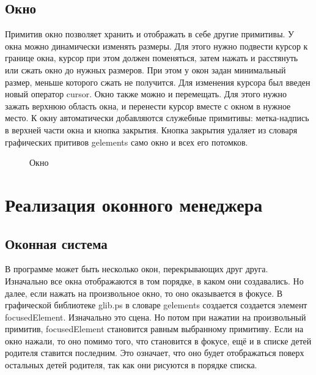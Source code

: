 \documentclass[14pt]{extarticle}
\begin{document}
	\subsection*{Окно}
	Примитив окно позволяет хранить и отображать в себе другие примитивы. У окна можно динамически изменять размеры. Для этого нужно подвести курсор к границе окна, курсор при этом должен поменяться, затем нажать и расстянуть или сжать окно до нужных размеров. При этом у окон задан минимальный размер, меньше которого сжать не получится. Для изменения курсора был введен новый оператор cursor. Окно также можно и перемещать. Для этого нужно зажать верхнюю область окна, и перенести курсор вместе с окном в нужное место. К окну автоматически добавляются служебные примитивы: метка-надпись в верхней части окна и кнопка закрытия. Кнопка закрытия удаляет из словаря графических притивов gelements само окно и всех его потомков.
		\begin{figure}[h]
		\caption{ Окно }
		\label{ris:image}
		\end{figure}	
	\pagebreak
	
	\section{Реализация оконного менеджера}
	\subsection{ Оконная система }
	В программе может быть несколько окон, перекрывающих друг друга. Изначально все окна отображаются в том порядке, в каком они создавались. Но далее, если нажать на произвольное окно, то оно оказывается в фокусе. В графической библиотеке glib.ps в словаре gelements создается создается элемент focusedElement. Изначально это сцена. Но потом при нажатии на произвольный примитив, focusedElement становится равным выбранному примитиву. Если на окно нажали, то оно помимо того, что становится в фокусе, ещё и в списке детей родителя ставится последним. Это означает, что оно будет отображаться поверх остальных детей родителя, так как они рисуются в порядке списка.
\end{document}

